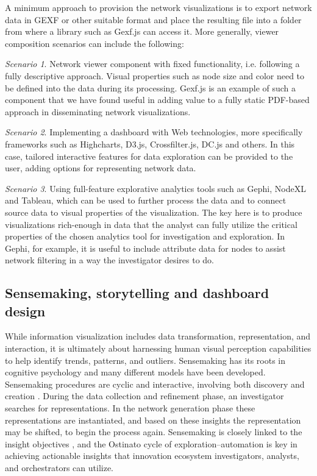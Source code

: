 A minimum approach to provision the network visualizations is to export network data in GEXF or other suitable format and place the resulting file into a folder from where a library such as Gexf.js can access it. More generally, viewer composition scenarios can include the following:

\emph{Scenario 1}. Network viewer component with fixed functionality, i.e. following a fully descriptive approach. Visual properties such as node size and color need to be defined into the data during its processing. Gexf.js is an example of such a component that we have found useful in adding value to a fully static PDF-based approach in disseminating network visualizations.

\emph{Scenario 2}. Implementing a dashboard with Web technologies, more specifically frameworks such as Highcharts, D3.js, Crossfilter.js, DC.js and others. In this case, tailored interactive features for data exploration can be provided to the user, adding options for representing network data. 

\emph{Scenario 3}. Using full-feature explorative analytics tools such as Gephi, NodeXL and Tableau, which can be used to further process the data and to connect source data to visual properties of the visualization. The key here is to produce visualizations rich-enough in data that the analyst can fully utilize the critical properties of the chosen analytics tool for investigation and exploration. In Gephi, for example, it is useful to include attribute data for nodes to assist network filtering in a way the investigator desires to do.

\subsection{Sensemaking, storytelling and dashboard design}

While information visualization includes data transformation, representation, and interaction, it is ultimately about harnessing human visual perception capabilities to help identify trends, patterns, and outliers. Sensemaking has its roots in cognitive psychology and many different models have been developed. Sensemaking procedures are cyclic and interactive, involving both discovery and creation \citep{North2006}. During the data collection and refinement phase, an investigator searches for representations. In the network generation phase these representations are instantiated, and based on these insights the representation may be shifted, to begin the process again. Sensemaking is closely linked to the insight objectives \citep{Konno2014}, and the Ostinato cycle of exploration–automation is key in achieving actionable insights that innovation ecosystem investigators, analysts, and orchestrators can utilize.

